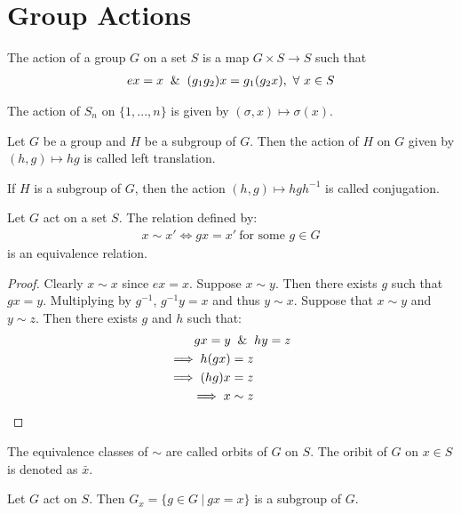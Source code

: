 \section{Group Actions}
\begin{definition}
  The action of a group $G$ on a set $S$ is a map $G\times S\to S$ such that
  \begin{align*}
    ex = x \And (g_1g_2)x = g_1(g_2x),\ \forall\ x\in S
  \end{align*}
\end{definition}
\begin{example}
  The action of $S_n$ on $\{1,...,n\}$ is given by $(\sigma, x) \mapsto \sigma(x)$.
\end{example}
\begin{example}
  Let $G$ be a group and $H$ be a subgroup of $G$. Then the action of $H$ on $G$ given by $(h,g) \mapsto hg$ is called left translation.
\end{example}
\begin{example}
  If $H$ is a subgroup of $G$, then the action $(h,g) \mapsto hgh^{-1}$ is called conjugation.
\end{example}
\begin{theorem}
  Let $G$ act on a set $S$. The relation defined by:
  \begin{align*}
    x\sim x' \iff gx = x'\ \text{for some $g\in G$} 
  \end{align*}
  is an equivalence relation.
\end{theorem}
\begin{proof}
  Clearly $x\sim x$ since $ex = x$. Suppose $x\sim y$. Then there exists $g$ such that $gx = y$. Multiplying by $g^{-1}$, $g^{-1}y = x$ and thus $y\sim x$. Suppose that $x\sim y$ and $y\sim z$. Then there exists $g$ and $h$ such that:
  \begin{align*}
    gx = y &\And hy = z\\
    \implies h(gx) &= z\\
    \implies (hg)x &= z\\
    \implies x &\sim z
  \end{align*}
\end{proof}
\begin{definition}
  The equivalence classes of $\sim$ are called orbits of $G$ on $S$. The oribit of $G$ on $x\in S$ is denoted as $\bar{x}$.
\end{definition}
\begin{theorem}
  Let $G$ act on $S$. Then $G_x = \{g\in G\ |\ gx=x\}$ is a subgroup of $G$.
\end{theorem}
